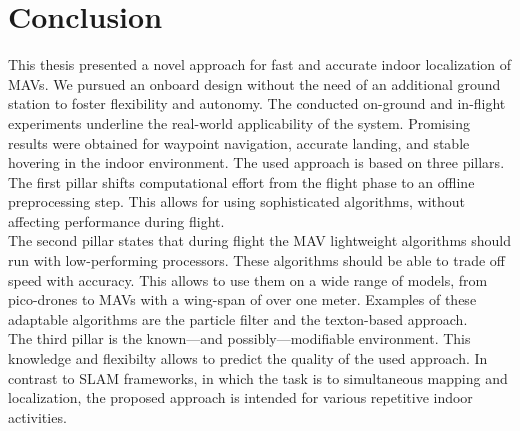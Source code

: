 \chapter{Conclusion}
\label{chap:conclusion}

This thesis presented a novel approach for fast and accurate indoor
localization of MAVs. We pursued an onboard design without the need of
an additional ground station to foster flexibility and autonomy. The
conducted on-ground and in-flight experiments underline the real-world
applicability of the system. Promising results were obtained for
waypoint navigation, accurate landing, and stable hovering in the
indoor environment. The
used approach is based on three pillars.\\
The first pillar shifts computational effort from the flight phase to
an offline preprocessing step. This allows for using sophisticated
algorithms, without affecting performance during flight.\\
The second pillar states that during flight the MAV lightweight
algorithms should run with low-performing processors. These algorithms
should be able to trade off speed with accuracy. This allows to use
them on a wide range of models, from pico-drones to MAVs with a
wing-span of over one meter. Examples of these adaptable algorithms
are the particle filter
and the texton-based approach. \\
The third pillar is the known---and possibly---modifiable
environment. This knowledge and flexibilty allows to predict the
quality of the used approach. In contrast to SLAM frameworks, in which
the task is to simultaneous mapping and localization, the proposed
approach is intended for various repetitive indoor activities.
